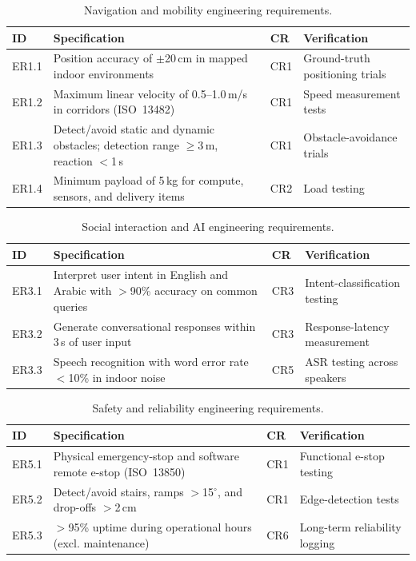 \documentclass[11pt,a4paper]{article}
\begin{document}
\begin{table}[H]
\centering
\small
\begin{tabularx}{\linewidth}{|l|>{\raggedright\arraybackslash}X|l|>{\raggedright\arraybackslash}X|}
\hline
\textbf{ID} & \textbf{Specification} & \textbf{CR} & \textbf{Verification} \\
\hline
ER1.1 & Position accuracy of $\pm$20\,cm in mapped indoor environments & CR1 & Ground-truth positioning trials \\
\hline
ER1.2 & Maximum linear velocity of 0.5--1.0\,m/s in corridors (ISO~13482) & CR1 & Speed measurement tests \\
\hline
ER1.3 & Detect/avoid static and dynamic obstacles; detection range $\geq$3\,m, reaction $<$1\,s & CR1 & Obstacle-avoidance trials \\
\hline
ER1.4 & Minimum payload of 5\,kg for compute, sensors, and delivery items & CR2 & Load testing \\
\hline
\end{tabularx}
\caption{Navigation and mobility engineering requirements.}
\label{tab:er_navigation}
\end{table}

\begin{table}[H]
\centering
\small
\begin{tabularx}{\linewidth}{|l|>{\raggedright\arraybackslash}X|l|>{\raggedright\arraybackslash}X|}
\hline
\textbf{ID} & \textbf{Specification} & \textbf{CR} & \textbf{Verification} \\
\hline
ER3.1 & Interpret user intent in English and Arabic with $>$90\% accuracy on common queries & CR3 & Intent-classification testing \\
\hline
ER3.2 & Generate conversational responses within 3\,s of user input & CR3 & Response-latency measurement \\
\hline
ER3.3 & Speech recognition with word error rate $<$10\% in indoor noise & CR5 & ASR testing across speakers \\
\hline
\end{tabularx}
\caption{Social interaction and AI engineering requirements.}
\label{tab:er_ai}
\end{table}

\begin{table}[H]
\centering
\small
\begin{tabularx}{\linewidth}{|l|>{\raggedright\arraybackslash}X|l|>{\raggedright\arraybackslash}X|}
\hline
\textbf{ID} & \textbf{Specification} & \textbf{CR} & \textbf{Verification} \\
\hline
ER5.1 & Physical emergency-stop and software remote e-stop (ISO~13850) & CR1 & Functional e-stop testing \\
\hline
ER5.2 & Detect/avoid stairs, ramps $>$15$^\circ$, and drop-offs $>$2\,cm & CR1 & Edge-detection tests \\
\hline
ER5.3 & $>$95\% uptime during operational hours (excl. maintenance) & CR6 & Long-term reliability logging \\
\hline
\end{tabularx}
\caption{Safety and reliability engineering requirements.}
\label{tab:er_safety}
\end{table}
\end{document}
